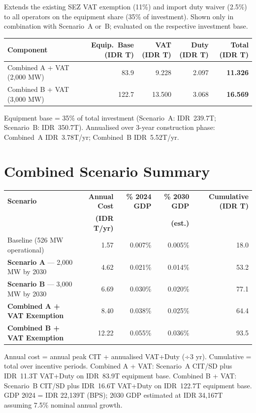\documentclass[a4paper,10pt]{article}
\begin{document}
Extends the existing SEZ VAT exemption (11\%) and import duty waiver (2.5\%) to all operators on the equipment share (35\% of investment). Shown only in combination with Scenario~A or~B; evaluated on the respective investment base.

\small
\begin{tabular}{lrrrr}
  \toprule
  \textbf{Component} & \textbf{Equip.\ Base (IDR T)} & \textbf{VAT (IDR T)} & \textbf{Duty (IDR T)} & \textbf{Total (IDR T)} \\
  \midrule
  Combined A + VAT (2,000 MW) & 83.9 & 9.228 & 2.097 & \textbf{11.326} \\
  Combined B + VAT (3,000 MW) & 122.7 & 13.500 & 3.068 & \textbf{16.569} \\
  \bottomrule
\end{tabular}

\vspace{4pt}
{\footnotesize\color{midgray}
  Equipment base = 35\% of total investment (Scenario~A: IDR~239.7T; Scenario~B: IDR~350.7T). Annualised over 3-year construction phase: Combined~A IDR~3.78T/yr; Combined~B IDR~5.52T/yr.
}

\vspace{10pt}

\section{Combined Scenario Summary}

\small
\begin{tabular}{lrrrr}
  \toprule
  \textbf{Scenario} & \textbf{Annual Cost} & \textbf{\% 2024 GDP} & \textbf{\% 2030 GDP} & \textbf{Cumulative (IDR T)} \\
  & \textbf{(IDR T/yr)} & & \textbf{(est.)} & \\
  \midrule
  Baseline (526 MW operational)  & 1.57  & 0.007\% & 0.005\% &  18.0 \\
  \rowcolor{lightgray}
  \textbf{Scenario A} --- 2,000 MW by 2030 & 4.62 & 0.021\% & 0.014\% & 53.2 \\
  \textbf{Scenario B} --- 3,000 MW by 2030 & 6.69 & 0.030\% & 0.020\% & 77.1 \\
  \rowcolor{lightgray}
  \textbf{Combined A + VAT Exemption}      & 8.40 & 0.038\% & 0.025\% & 64.4 \\
  \textbf{Combined B + VAT Exemption}      & 12.22 & 0.055\% & 0.036\% & 93.5 \\
  \bottomrule
\end{tabular}

\vspace{4pt}
{\footnotesize\color{midgray}
  Annual cost = annual peak CIT + annualised VAT+Duty (÷3 yr). Cumulative = total over incentive periods.
  Combined A + VAT: Scenario~A CIT/SD plus IDR~11.3T VAT+Duty on IDR~83.9T equipment base.
  Combined B + VAT: Scenario~B CIT/SD plus IDR~16.6T VAT+Duty on IDR~122.7T equipment base.
  GDP 2024 = IDR 22,139T (BPS); 2030 GDP estimated at IDR 34,167T assuming 7.5\% nominal annual growth.
}
\end{document}
